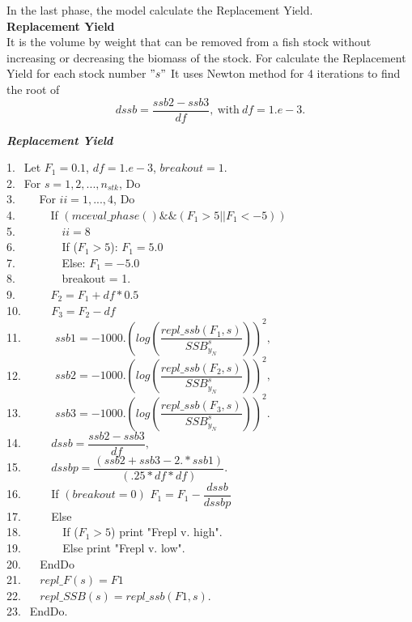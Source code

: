 \documentclass{article}
\begin{document}
In the last phase, the model calculate the Replacement Yield.\\

\textbf{Replacement Yield}\\
It is the volume by weight that can be removed from a fish stock without increasing or decreasing the biomass of the stock.
For calculate the Replacement Yield for each stock  number $"s"$ It uses Newton method for 4 iterations to find the root of 
\begin{equation}
    dssb   = \dfrac{ssb2 - ssb3}{df}, \ \text{with} \  df=1.e-3.
\end{equation}

\begin{algorithm}
	\caption{{\bf \textit{Replacement Yield}}}
	1.  $\  \ $Let $F_1=0.1$, $df=1.e-3$, $breakout=1$. \\
	2.  $\  \ $For $s=1,2,...,n_{stk}$, Do\\
    3.  $\  \ \quad$ For $ii=1,...,4$, Do \\
	4.  $\  \ \qquad$ If $(mceval\_phase()\&\&(F_1>5||F_1< -5)) $\\
	5.  $\  \ \qquad$$\quad$ $ii=8$\\
	6.  $\  \ \qquad$$\quad$  If ($F_1>5$): $F_1=5.0$\\
	7.  $\  \ \qquad$$\quad$   Else: $F_1=-5.0$\\
	8.  $\  \ \qquad$$\quad$   breakout = 1. \\
	9.  $\  \ \qquad$   $F_2 = F_1+df*0.5$\\
	10. $\qquad$  $F_3 = F_2 -df$\\
	11. $\quad$ $\quad$  $ssb1=-1000.\left(log\left(\dfrac{repl\_ssb(F_1,s)}{SSB^s_{y_N}}\right)\right)^2,$\\
    12. $\quad$ $\quad$  $ssb2=-1000.\left(log\left(\dfrac{repl\_ssb(F_2,s)}{SSB^s_{y_N}}\right)\right)^2,$\\
    13. $\quad$ $\quad$  $ssb3=-1000.\left(log\left(\dfrac{repl\_ssb(F_3,s)}{SSB^s_{y_N}}\right)\right)^2.$\\
    14. $\quad$$\quad$   $dssb   = \dfrac{ssb2 - ssb3}{df},$\\
    15. $\quad$$\quad$   $dssbp  = \dfrac{(ssb2 + ssb3 - 2.*ssb1)}{(.25*df*df)}$.\\
    16. $\quad$$\quad$   If $(breakout=0)$ $F_1=F_{1}-\dfrac{dssb}{dssbp}$\\
    17. $\quad$$\quad$   Else \\
    18. $\qquad$$\quad$   If ($F_1>5$) print "Frepl v. high". \\
    19. $\qquad$$\quad$   Else print "Frepl v. low". \\
    20. $\quad$ EndDo\\
    21. $\quad$ $repl\_F(s) = F1$\\
    22. $\quad$ $repl\_SSB(s) = repl\_ssb(F1,s)$.\\
    23. $\  \ $EndDo.
    
\end{algorithm}
\end{document}

